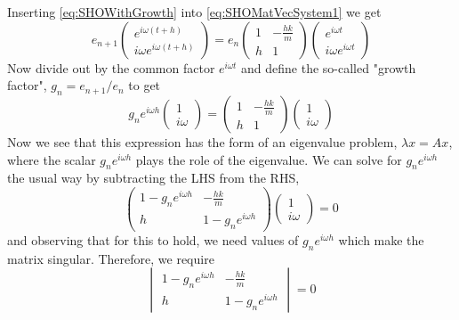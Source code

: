 \documentclass[hidelinks,notitlepage]{book}
\begin{document}
Inserting \cref{eq:SHOWithGrowth} into \cref{eq:SHOMatVecSystem1} we get
\begin{equation}
\nonumber
e_{n+1}
\begin{pmatrix}
e^{i \omega (t+h)} \\
i \omega e^{i \omega (t+h)}
\end{pmatrix}
=
e_n
\begin{pmatrix}
	1 & -\frac{h k}{m} \\
	h & 1
\end{pmatrix}
\begin{pmatrix}
e^{i \omega t} \\
i \omega e^{i \omega t}
\end{pmatrix}
\end{equation}
Now divide out by the common factor $e^{i \omega t}$ and define the so-called "growth factor", $g_n = e_{n+1}/e_n$ to get
\begin{equation}
\nonumber
g_n e^{i \omega h}
\begin{pmatrix}
1 \\
i \omega 
\end{pmatrix}
=
\begin{pmatrix}
1 & -\frac{h k}{m} \\
h & 1
\end{pmatrix}
\begin{pmatrix}
1 \\
i \omega 
\end{pmatrix}
\end{equation}
Now we see that this expression has the form of an eigenvalue problem, $ \lambda {x} = {A} {x}$, where the scalar $g_n e^{i \omega h}$ plays the role of the eigenvalue.  We can solve for $g_n e^{i \omega h}$ the usual way by subtracting the LHS from the RHS,
\begin{equation}
\nonumber
\begin{pmatrix}
	1 - g_n e^{i \omega h} & -\frac{h k}{m} \\
	h & 1 - g_n e^{i \omega h} 
\end{pmatrix}
\begin{pmatrix}
	1 \\
	i \omega 
\end{pmatrix}
= 0
\end{equation}
and observing that for this to hold, we need values of $g_n e^{i \omega h}$ which make the matrix singular.  Therefore, we require
\begin{equation}
\nonumber
\begin{vmatrix}
1 - g_n e^{i \omega h} & -\frac{h k}{m} \\
h & 1 - g_n e^{i \omega h} 
\end{vmatrix}
= 0
\end{equation}
\end{document}
